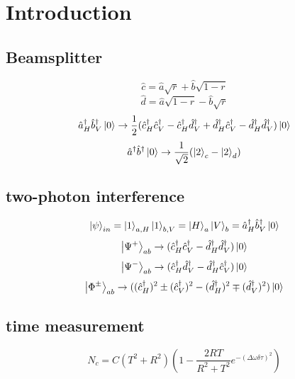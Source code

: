 \documentclass[9pt]{article}
\begin{document}
\section{Introduction}
\subsection{Beamsplitter}
\begin{equation*}
    \hat{c}=\hat{a}\sqrt{r}+\hat{b}\sqrt{1-r}
\end{equation*}
\begin{equation*}
    \hat{d}=\hat{a}\sqrt{1-r}-\hat{b}\sqrt{r}
\end{equation*}
\begin{equation*}
    \hat{a}^\dagger_H\hat{b}^\dagger_V\ket{0} \rightarrow \frac{1}{2} 
    (\hat{c}^\dagger_H\hat{c}^\dagger_V-\hat{c}^\dagger_H\hat{d}^\dagger_V+\hat{d}^\dagger_H\hat{c}^\dagger_V-\hat{d}^\dagger_H\hat{d}^\dagger_V)\ket{0}
\end{equation*}
\begin{equation*}
    \hat{a}^\dagger\hat{b}^\dagger\ket{0} \rightarrow \frac{1}{\sqrt{2}} 
    (\ket{2}_c- \ket{2}_d)
\end{equation*}
\subsection{two-photon interference}
\begin{equation*}
    \ket{\psi}_{in} = \ket{1}_{a,H}\ket{1}_{b,V}=\ket{H}_a\ket{V}_b=\hat{a}^\dagger_H\hat{b}^\dagger_V\ket{0}
\end{equation*}
\begin{equation*}
    \ket{\Psi^{+}}_{ab} \rightarrow  (\hat{c}^\dagger_H\hat{c}^\dagger_V-\hat{d}^\dagger_H\hat{d}^\dagger_V)\ket{0}
\end{equation*}
\begin{equation*}
    \ket{\Psi^{-}}_{ab} \rightarrow  (\hat{c}^\dagger_H\hat{d}^\dagger_V-\hat{d}^\dagger_H\hat{c}^\dagger_V)\ket{0}
\end{equation*}
\begin{equation*}
    \ket{\Phi^{\pm}}_{ab} \rightarrow  ((\hat{c}^\dagger_H)^2\pm (\hat{c}^\dagger_V)^2-(\hat{d}^\dagger_H)^2 \mp (\hat{d}^\dagger_V)^2)\ket{0}
\end{equation*}
\subsection{time measurement}
\begin{equation*}
    N_c=C(T^2+R^2)(1-\frac{2RT}{R^2+T^2}e^{-(\Delta\omega\delta\tau)^2})
\end{equation*}
\end{document}
